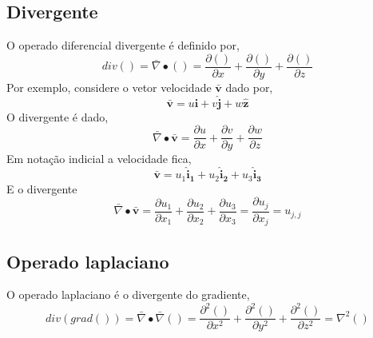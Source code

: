 \subsection{Divergente}
%
O operado diferencial divergente é definido por,
%
\begin{equation}
	div() = \bar \nabla \bullet () = \frac{\partial()}{\partial x} + \frac{\partial()}{\partial y} + \frac{\partial()}{\partial z} 
\end{equation}
%
Por exemplo, considere o vetor velocidade $\pmb{\bar v}$ dado por,
%
\begin{equation}
	\pmb{\bar v} =	u \pmb{\hat i} + v \pmb{\hat j} + w \pmb{\hat z}
\end{equation}
%
O divergente é dado,
%
\begin{equation}
	\bar \nabla \bullet \pmb{\bar v} = \frac{\partial u}{\partial x} + \frac{\partial v}{\partial y} + \frac{\partial w}{\partial z} 
\end{equation}
%
Em notação indicial a velocidade fica,
%
\begin{equation}
	\pmb{\bar v} =	u_1 \pmb{\hat i_1} + u_2 \pmb{\hat i_2} + u_3 \pmb{\hat i_3}
\end{equation}
%
E o divergente
%
\begin{equation}
	\bar \nabla \bullet \pmb{\bar v} = \frac{\partial u_1}{\partial x_1} + \frac{\partial u_2}{\partial x_2} + \frac{\partial u_3}{\partial x_3} = \frac{\partial u_j}{\partial x_j} = u_{j,j}
\end{equation}
%
\subsection{Operado laplaciano}
%
O operado laplaciano é o divergente do gradiente,
\begin{equation}
	div(grad()) = \bar \nabla \bullet \bar \nabla() = \frac{\partial^2()}{\partial x^2} + \frac{\partial^2()}{\partial y^2} + \frac{\partial^2()}{\partial z^2} = \nabla^2 ()
\end{equation}




